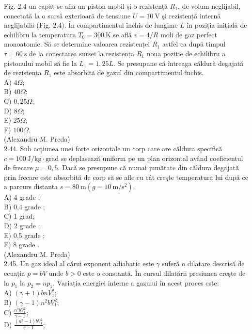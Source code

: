 Fig. 2.4 un capăt se află un piston mobil și o rezistență $R_{1}$, de volum neglijabil, conectată la o sursă exterioară de tensiune $U=10 \mathrm{~V}$ şi rezistență internă neglijabilă (Fig. 2.4). În compartimentul închis de lungime $L$ în poziția inițială de echilibru la temperatura $T_{0}=300 \mathrm{~K}$ se află $v=4 / R$ moli de gaz perfect monoatomic. Să se determine valoarea rezistenței $R_{1}$ astfel ca după timpul $\tau=60 \mathrm{~s}$ de la conectarea sursei la rezistența $R_{1}$ noua poziție de echilibru a pistonului mobil să fie la $L_{1}=1,25 L$. Se presupune că întreaga căldură degajată de rezistența $R_{1}$ este absorbitã de gazul din compartimentul închis.\\
A) $4 \Omega$;\\
B) $40 \Omega$;\\
C) $0,25 \Omega$;\\
D) $8 \Omega$;\\
E) $25 \Omega$;\\
F) $100 \Omega$.\\
(Alexandru M. Preda)\\
2.44. Sub acțiunea unei forțe orizontale un corp care are căldura specifică $c=100 \mathrm{~J} / \mathrm{kg} \cdot \mathrm{grad}$ se deplasează uniform pe un plan orizontal având coeficientul de frecare $\mu=0,5$. Dacă se presupune că numai jumătate din căldura degajată prin frecare este absorbită de corp să se afle cu cât creşte temperatura lui după ce a parcurs distanta $s=80 \mathrm{~m}\left(g=10 \mathrm{~m} / \mathrm{s}^{2}\right)$.\\
A) 4 grade ;\\
B) 0,4 grade ;\\
C) 1 grad;\\
D) 2 grade ;\\
E) 0,5 grade ;\\
F) 8 grade .\\
(Alexandru M. Preda)\\
2.45. Un gaz ideal al cărui exponent adiabatic este $\gamma$ suferă o dilatare descrisă de ecuația $p=b V$ unde $b>0$ este o constantă. În cursul dilatării presiunea creşte de la $p_{1}$ la $p_{2}=n p_{1}$. Variația energiei interne a gazului în acest proces este:\\
A) $(\gamma+1) b n V_{1}^{2}$;\\
B) $(\gamma-1) n^{2} b V_{1}^{2}$;\\
C) $\frac{n^{2} b V_{1}^{2}}{\gamma-1}$;\\
D) $\frac{\left(n^{2}-1\right) b V_{1}^{2}}{\gamma-1}$;\\
